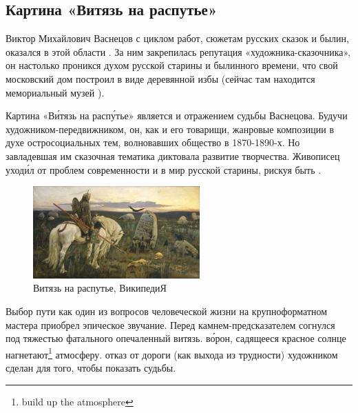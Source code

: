 \subsection{Картина «Витязь на распутье»}

Виктор Михайлович Васнецов с циклом работ,  сюжетам русских сказок и былин, оказался  в этой области . За ним закрепилась репутация «художника-сказочника», он настолько проникся духом русской старины и былинного времени, что свой московский дом построил в виде деревянной избы (сейчас там находится мемориальный музей ).


Картина «В\'{и}тязь на расп\'{у}тье»  является и отражением судьбы Васнецова.
Будучи  художником-передвижником, он, как и его товарищи,  жанровые композиции в духе остросоциальных тем, волновавших общество в 1870-1890-х.
Но завладевшая им сказочная тематика диктовала  развитие творчества. Живописец уход\'{и}л от проблем современности и  в мир русской старины, рискуя быть .

\begin{figure}
    \begin{center}
        \includegraphics[width=0.57\textwidth]{img/TheKnightAtTheCrossroads.jpg}
    \end{center}
    \caption{Витязь на распутье, ВикипедиЯ}
\end{figure}
Выбор пути как один из  вопросов человеческой жизни на крупноформатном  мастера приобрел эпическое звучание.
Перед камнем-предсказателем согнулся под тяжестью фатального  опечаленный витязь.  в\'{о}рон, садящееся красное солнце нагнетают\footnote{build up the atmosphere} атмосферу.  отказ от  дороги (как выхода из трудности) художником сделан для того, чтобы показать  судьбы.

